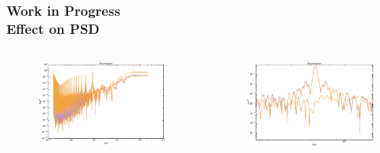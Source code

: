 \documentclass[hyperref={pdfpagelabels=false}]{beamer}
\begin{document}
\begin{frame}
\frametitle{Work in Progress\\Effect on PSD}
\begin{columns}
\centering
  \begin{column}{0.5\textwidth}
    \begin{figure}
      \includegraphics[scale=0.04]{images/Ps_full.jpg}
    \end{figure}
  \end{column}
  \begin{column}{0.5\textwidth}
      \begin{figure}
        \includegraphics[scale=0.12]{images/Ps_detail.jpg}
      \end{figure}
  \end{column}
\end{columns}
\begin{columns}
\centering

\end{columns}
\end{frame}
\end{document}
